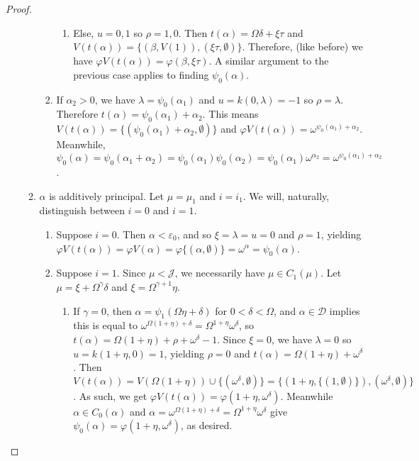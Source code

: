 \documentclass{article}
\theoremstyle{definition}
\theoremstyle{plain}
\theoremstyle{plain}
\theoremstyle{plain}
\theoremstyle{plain}
\theoremstyle{remark}
\theoremstyle{remark}
\theoremstyle{remark}
\theoremstyle{plain}
\theoremstyle{plain}
\begin{document}
\begin{proof}
\begin{enumerate}
\begin{enumerate}
\begin{enumerate}
\begin{enumerate}
                \item Else, $u = 0, 1$ so $\rho = 1, 0$. Then $t(\alpha) = \Omega \delta + \xi \tau$ and $V(t(\alpha)) = \{(\beta, V(1)), (\xi \tau, \emptyset)\}$. Therefore, (like before) we have $\varphi V(t(\alpha)) = \varphi(\beta, \xi \tau)$. A similar argument to the previous case applies to finding $\psi_0(\alpha)$.
            \end{enumerate}
        \item If $\alpha_2 > 0$, we have $\lambda = \psi_0(\alpha_1)$ and $u = k(0, \lambda) = -1$ so $\rho = \lambda$. Therefore $t(\alpha) = \psi_0(\alpha_1) + \alpha_2$. This means $V(t(\alpha)) = \{(\psi_0(\alpha_1) + \alpha_2,\emptyset)\}$ and $\varphi V(t(\alpha)) = \omega^{\psi_0(\alpha_1) + \alpha_2}$. Meanwhile, $\psi_0(\alpha) = \psi_0(\alpha_1 + \alpha_2) = \psi_0(\alpha_1) \psi_0(\alpha_2) = \psi_0(\alpha_1) \omega^{\alpha_2} = \omega^{\psi_0(\alpha_1) + \alpha_2}$.
        \end{enumerate}
            
        \item $\alpha$ is additively principal. Let $\mu = \mu_1$ and $i = i_1$. We will, naturally, distinguish between $i = 0$ and $i = 1$.
        \begin{enumerate}
            \item Suppose $i = 0$. Then $\alpha < \varepsilon_0$, and so $\xi = \lambda = u = 0$ and $\rho = 1$, yielding $\varphi V(t(\alpha)) = \varphi V(\alpha) = \varphi \{(\alpha, \emptyset)\} = \omega^\alpha = \psi_0(\alpha)$.
            \item Suppose $i = 1$. Since $\mu < \mathcal{J}$, we necessarily have $\mu \in C_1(\mu)$. Let $\mu = \xi + \Omega^\gamma \delta$ and $\xi = \Omega^{\gamma+1} \eta$.
            \begin{enumerate}
                \item If $\gamma = 0$, then $\alpha = \psi_1(\Omega \eta + \delta)$ for $0 < \delta < \Omega$, and $\alpha \in \mathcal{D}$ implies this is equal to $\omega^{\Omega (1 + \eta) + \delta} = \Omega^{1 + \eta} \omega^\delta$, so $t(\alpha) = \Omega (1 + \eta) + \rho + \omega^\delta - 1$. Since $\xi = 0$, we have $\lambda = 0$ so $u = k(1+\eta, 0) = 1$, yielding $\rho = 0$ and $t(\alpha) = \Omega (1 + \eta) + \omega^\delta$. Then $V(t(\alpha)) = V(\Omega (1 + \eta)) \cup \{(\omega^\delta, \emptyset)\} = \{(1+\eta, \{(1,\emptyset)\}), (\omega^\delta, \emptyset)\}$. As such, we get $\varphi V(t(\alpha)) = \varphi(1+\eta, \omega^\delta)$. Meanwhile $\alpha \in C_0(\alpha)$ and $\alpha = \omega^{\Omega (1 + \eta) + \delta} = \Omega^{1+\eta} \omega^\delta$ give $\psi_0(\alpha) = \varphi(1+\eta, \omega^\delta)$, as desired.



\end{enumerate}
\end{enumerate}
\end{enumerate}
\end{enumerate}
\end{proof}
\end{document}
